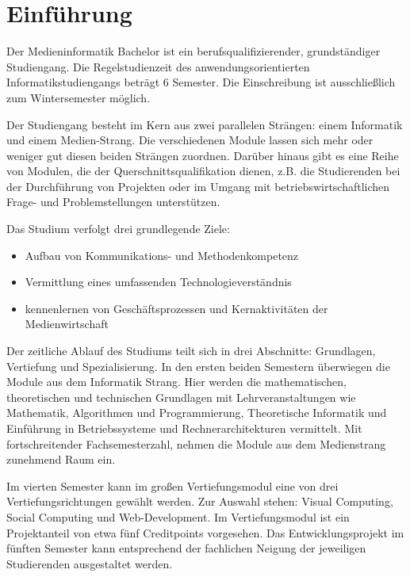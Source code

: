 \hypertarget{einfuxfchrungpathlabelmi-2017modulbeschreibungen-bachelor01-einfuehrung}{%
\chapter{Einführung\label{/mi-2017/modulbeschreibungen-bachelor/01-einfuehrung}}\label{einfuxfchrungpathlabelmi-2017modulbeschreibungen-bachelor01-einfuehrung}}

Der Medieninformatik Bachelor ist ein berufsqualifizierender,
grundständiger Studiengang. Die Regelstudienzeit des
anwendungsorientierten Informatikstudiengangs beträgt 6 Semester. Die
Einschreibung ist ausschließlich zum Wintersemester möglich.

Der Studiengang besteht im Kern aus zwei parallelen Strängen: einem
Informatik und einem Medien-Strang. Die verschiedenen Module lassen sich
mehr oder weniger gut diesen beiden Strängen zuordnen. Darüber hinaus
gibt es eine Reihe von Modulen, die der Querschnittsqualifikation
dienen, z.B. die Studierenden bei der Durchführung von Projekten oder im
Umgang mit betriebswirtschaftlichen Frage- und Problemstellungen
unterstützen.

Das Studium verfolgt drei grundlegende Ziele:

\begin{itemize}
\tightlist
\item
  Aufbau von Kommunikations- und Methodenkompetenz
\item
  Vermittlung eines umfassenden Technologieverständnis
\item
  kennenlernen von Geschäftsprozessen und Kernaktivitäten der
  Medienwirtschaft
\end{itemize}

Der zeitliche Ablauf des Studiums teilt sich in drei Abschnitte:
Grundlagen, Vertiefung und Spezialisierung. In den ersten beiden
Semestern überwiegen die Module aus dem Informatik Strang. Hier werden
die mathematischen, theoretischen und technischen Grundlagen mit
Lehrveranstaltungen wie Mathematik, Algorithmen und Programmierung,
Theoretische Informatik und Einführung in Betriebssysteme und
Rechnerarchitekturen vermittelt. Mit fortschreitender Fachsemesterzahl,
nehmen die Module aus dem Medienstrang zunehmend Raum ein.

Im vierten Semester kann im großen Vertiefungsmodul eine von drei
Vertiefungsrichtungen gewählt werden. Zur Auswahl stehen: Visual
Computing, Social Computing und Web-Development. Im Vertiefungsmodul ist
ein Projektanteil von etwa fünf Creditpoints vorgesehen. Das
Entwicklungsprojekt im fünften Semester kann entsprechend der fachlichen
Neigung der jeweiligen Studierenden ausgestaltet werden.

